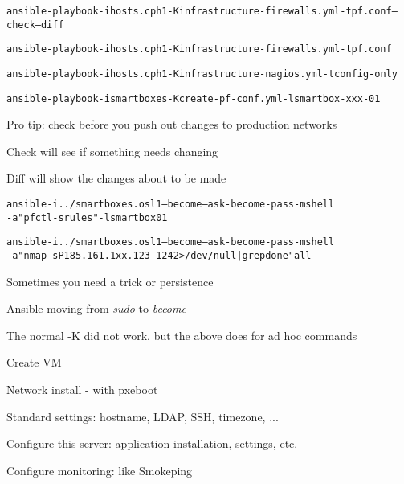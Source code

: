 \documentclass[Screen16to9,17pt]{foils}
\begin{document}

\begin{alltt}\footnotesize
ansible-playbook -i hosts.cph1 -K infrastructure-firewalls.yml -t pf.conf --check --diff

ansible-playbook -i hosts.cph1 -K infrastructure-firewalls.yml -t pf.conf

ansible-playbook -i hosts.cph1 -K infrastructure-nagios.yml -t config-only

ansible-playbook -i smartboxes -K create-pf-conf.yml -l smartbox-xxx-01
\end{alltt}

\begin{list2}
\item Pro tip: check before you push out changes to production networks \smiley
\item Check will see if something needs changing
\item Diff will show the changes about to be made
\end{list2}


\begin{alltt}\footnotesize
ansible -i ../smartboxes.osl1 --become --ask-become-pass -m shell
-a "pfctl -s rules" -l smartbox01

ansible -i ../smartboxes.osl1 --become --ask-become-pass -m shell
-a "nmap -sP 185.161.1xx.123-124 2> /dev/null| grep done" all
\end{alltt}

\begin{list2}
\item Sometimes you need a trick or persistence
\item Ansible moving from \emph{sudo} to \emph{become}
\item The normal -K did not work, but the above does for ad hoc commands
\end{list2}


\begin{list2}
\item Create VM
\item Network install - with pxeboot
\item Standard settings: hostname, LDAP, SSH, timezone,  ...
\item Configure this server: application installation, settings, etc.
\item Configure monitoring: like Smokeping
\end{list2}
\end{document}
